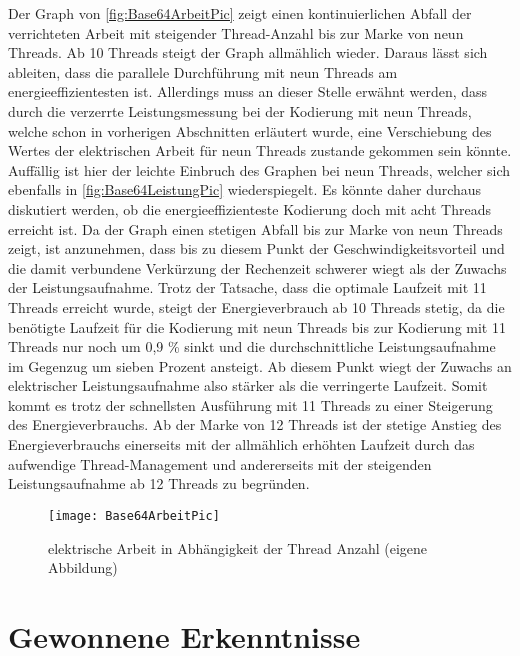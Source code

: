 Der Graph von \autoref{fig:Base64ArbeitPic} zeigt einen kontinuierlichen Abfall der verrichteten Arbeit mit steigender Thread-Anzahl bis zur Marke von neun Threads. Ab 10 Threads steigt der Graph allmählich wieder. Daraus lässt sich ableiten, dass die parallele Durchführung mit neun Threads am energieeffizientesten ist. Allerdings muss an dieser Stelle erwähnt werden, dass durch die verzerrte Leistungsmessung bei der Kodierung mit neun Threads, welche schon in vorherigen Abschnitten erläutert wurde, eine Verschiebung des Wertes der elektrischen Arbeit für neun Threads zustande gekommen sein könnte. Auffällig ist hier der leichte Einbruch des Graphen bei neun Threads, welcher sich ebenfalls in \autoref{fig:Base64LeistungPic} wiederspiegelt. Es könnte daher durchaus diskutiert werden, ob die energieeffizienteste Kodierung doch mit acht Threads erreicht ist. Da der Graph einen stetigen Abfall bis zur Marke von neun Threads zeigt, ist anzunehmen, dass bis zu diesem Punkt der Geschwindigkeitsvorteil und die damit verbundene Verkürzung der Rechenzeit schwerer wiegt als der Zuwachs der Leistungsaufnahme. Trotz der Tatsache, dass die optimale Laufzeit mit 11 Threads erreicht wurde, steigt der Energieverbrauch ab 10 Threads stetig, da die benötigte Laufzeit für die Kodierung mit neun Threads bis zur Kodierung mit 11 Threads nur noch um 0,9 \% sinkt und die durchschnittliche Leistungsaufnahme im Gegenzug um sieben Prozent ansteigt. Ab diesem Punkt wiegt der Zuwachs an elektrischer Leistungsaufnahme also stärker als die verringerte Laufzeit. Somit kommt es trotz der schnellsten Ausführung mit 11 Threads zu einer Steigerung des Energieverbrauchs. Ab der Marke von 12 Threads ist der stetige Anstieg des Energieverbrauchs einerseits mit der allmählich erhöhten Laufzeit durch das aufwendige Thread-Management und andererseits mit der steigenden Leistungsaufnahme ab 12 Threads zu begründen.

\begin{figure}[H]
	\begin{center}	 
	\texttt{[image: Base64ArbeitPic]}
	\caption{elektrische Arbeit in Abhängigkeit der Thread Anzahl (eigene Abbildung)}
	\label{fig:Base64ArbeitPic} 
	\end{center}
\end{figure}

\section{Gewonnene Erkenntnisse}

